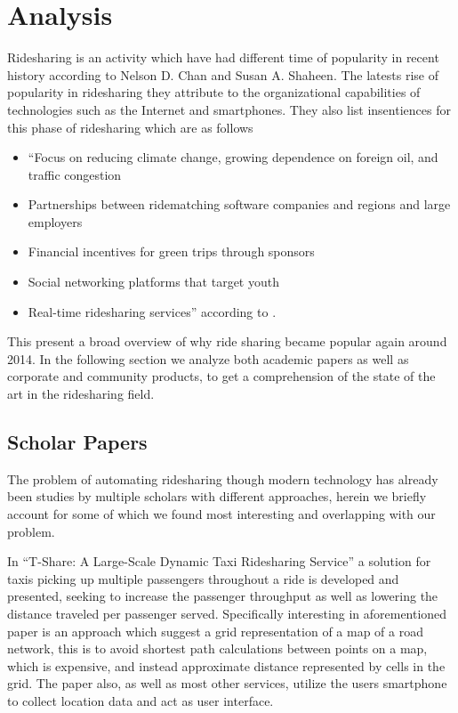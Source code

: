 \section{Analysis}
Ridesharing is an activity which have had different time of popularity in recent history according to Nelson D. Chan and Susan A. Shaheen\cite{doi:10.1080/01441647.2011.621557}.
The latests rise of popularity in ridesharing they attribute to the organizational capabilities of technologies such as the Internet and smartphones.
They also list insentiences for this phase of ridesharing which are as follows 
\begin{itemize}
  \item ``Focus on reducing climate change, growing dependence on foreign oil, and traffic congestion
  \item Partnerships between ridematching software companies and regions and large employers
  \item Financial incentives for green trips through sponsors
  \item Social networking platforms that target youth
  \item Real-time ridesharing services'' according to \cite{doi:10.1080/01441647.2011.621557}.
\end{itemize}

This present a broad overview of why ride sharing became popular again around 2014.
In the following section we analyze both academic papers as well as corporate and community products, to get a comprehension of the state of the art in the ridesharing field.

\subsection{Scholar Papers}
The problem of automating ridesharing though modern technology has already been studies by multiple scholars with different approaches, herein we briefly account for some of which we found most interesting and overlapping with our problem. 

In ``T-Share: A Large-Scale Dynamic Taxi Ridesharing Service'' \cite{ShuoMa2013} a solution for taxis picking up multiple passengers throughout a ride is developed and presented, seeking to increase the passenger throughput as well as lowering the distance traveled per passenger served.
Specifically interesting in aforementioned paper is an approach which suggest a grid representation of a map of a road network, this is to avoid shortest path calculations between points on a map, which is expensive, and instead approximate distance represented by cells in the grid.
The paper also, as well as most other services, utilize the users smartphone to collect location data and act as user interface.


